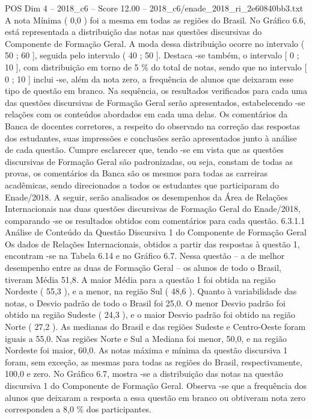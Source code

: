 \begin{textsample}{POS Dim 4 – 2018\_c6 – Score 12.00 – 2018\_c6/enade\_2018\_ri\_2e60840bb3.txt}
A nota Mínima ( 0,0 ) foi a mesma em todas as regiões do Brasil.
No Gráfico 6.6, está representada a distribuição das notas nas questões discursivas do Componente de Formação Geral.
A moda dessa distribuição ocorre no intervalo ( 50 ; 60 ], seguida pelo intervalo ( 40 ; 50 ].
Destaca -se também, o intervalo [ 0 ; 10 ], com distribuição em torno de 5 \% do total de notas, sendo que no intervalo [ 0 ; 10 ] inclui -se, além da nota zero, a frequência de alunos que deixaram esse tipo de questão em branco.
Na sequência, os resultados verificados para cada uma das questões discursivas de Formação Geral serão apresentados, estabelecendo -se relações com os conteúdos abordados em cada uma delas.
Os comentários da Banca de docentes corretores, a respeito do observado na correção das respostas dos estudantes, suas impressões e conclusões serão apresentados junto à análise de cada questão.
Cumpre esclarecer que, tendo -se em vista que as questões discursivas de Formação Geral são padronizadas, ou seja, constam de todas as provas, os comentários da Banca são os mesmos para todas as carreiras acadêmicas, sendo direcionados a todos os estudantes que participaram do Enade/2018.
A seguir, serão analisados os desempenhos da Área de Relações Internacionais nas duas questões discursivas de Formação Geral do Enade/2018, comparando -se os resultados obtidos com comentários para cada questão. 6.3.1.1 Análise de Conteúdo da Questão Discursiva 1 do Componente de Formação Geral Os dados de Relações Internacionais, obtidos a partir das respostas à questão 1, encontram -se na Tabela 6.14 e no Gráfico 6.7.
Nessa questão – a de melhor desempenho entre as duas de Formação Geral – os alunos de todo o Brasil, tiveram Média 51,8.
A maior Média para a questão 1 foi obtida na região Nordeste ( 55,3 ), e a menor, na região Sul ( 48,6 ).
Quanto à variabilidade das notas, o Desvio padrão de todo o Brasil foi 25,0.
O menor Desvio padrão foi obtido na região Sudeste ( 24,3 ), e o maior Desvio padrão foi obtido na região Norte ( 27,2 ).
As medianas do Brasil e das regiões Sudeste e Centro-Oeste foram iguais a 55,0.
Nas regiões Norte e Sul a Mediana foi menor, 50,0, e na região Nordeste foi maior, 60,0.
As notas máxima e mínima da questão discursiva 1 foram, sem exceção, as mesmas para todas as regiões do Brasil, respectivamente, 100,0 e zero.
No Gráfico 6.7, mostra -se a distribuição das notas na questão discursiva 1 do Componente de Formação Geral.
Observa -se que a frequência dos alunos que deixaram a resposta a essa questão em branco ou obtiveram nota zero correspondeu a 8,0 \% dos participantes.

\end{textsample}
